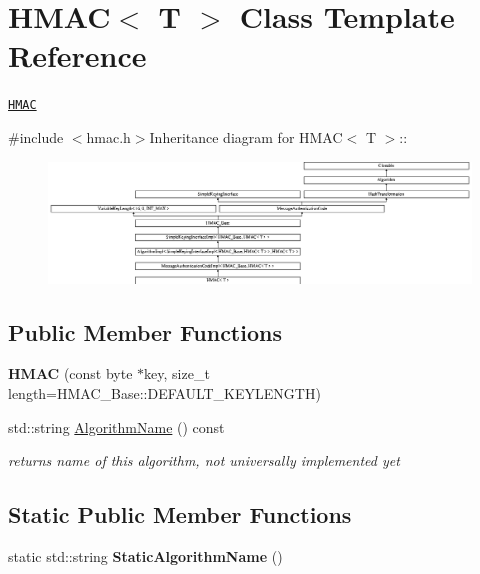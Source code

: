 \hypertarget{class_h_m_a_c}{
\section{HMAC$<$ T $>$ Class Template Reference}
\label{class_h_m_a_c}
}


\href{http://www.weidai.com/scan-mirror/mac.html#HMAC}{\tt HMAC}  


{\ttfamily \#include $<$hmac.h$>$}Inheritance diagram for HMAC$<$ T $>$::\begin{figure}[H]
\begin{center}
\leavevmode
\includegraphics[height=3.23077cm]{class_h_m_a_c}
\end{center}
\end{figure}
\subsection*{Public Member Functions}
\begin{DoxyCompactItemize}
\item 
\hypertarget{class_h_m_a_c_a84d6e40e7e5798283afbf40cb77dd19d}{
{\bfseries HMAC} (const byte $\ast$key, size\_\-t length=HMAC\_\-Base::DEFAULT\_\-KEYLENGTH)}
\label{class_h_m_a_c_a84d6e40e7e5798283afbf40cb77dd19d}

\item 
\hypertarget{class_h_m_a_c_a95712a54fd2506f31cc5cb26e86dd658}{
std::string \hyperlink{class_h_m_a_c_a95712a54fd2506f31cc5cb26e86dd658}{AlgorithmName} () const }
\label{class_h_m_a_c_a95712a54fd2506f31cc5cb26e86dd658}

\begin{DoxyCompactList}\small\item\em returns name of this algorithm, not universally implemented yet \item\end{DoxyCompactList}\end{DoxyCompactItemize}
\subsection*{Static Public Member Functions}
\begin{DoxyCompactItemize}
\item 
\hypertarget{class_h_m_a_c_a04d21d622f4f8d0d469d9e9231f0c3f8}{
static std::string {\bfseries StaticAlgorithmName} ()}
\label{class_h_m_a_c_a04d21d622f4f8d0d469d9e9231f0c3f8}

\end{DoxyCompactItemize}



